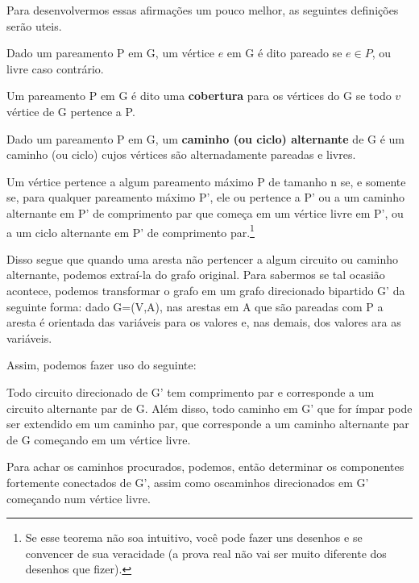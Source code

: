 \documentclass{article}
\begin{document}
Para desenvolvermos essas afirmações um pouco melhor, as seguintes definições serão uteis.

\begin{definition}
  Dado um pareamento P em G, um vértice $e$ em G é dito pareado se $e\in P$, ou livre caso contrário.
\end{definition}

\begin{definition}
  Um pareamento P em G é dito uma \textbf{cobertura} para os vértices do G se todo $v$ vértice de G pertence a P.
\end{definition}

\begin{definition}
  Dado um pareamento P em G, um \textbf{caminho (ou ciclo) alternante} de G é um caminho (ou ciclo) cujos vértices são alternadamente pareadas e livres.
\end{definition}

\begin{theorem}
  Um vértice pertence a algum pareamento máximo P de tamanho n se, e somente se, para qualquer pareamento máximo P', ele ou pertence a P' ou a um caminho alternante em P' de comprimento par que começa em um vértice livre em P', ou a um ciclo alternante
  em P' de comprimento par.\footnote{Se esse teorema não soa intuitivo, você pode fazer uns desenhos e se convencer de sua veracidade (a prova real não vai ser muito diferente dos desenhos que fizer).}
\end{theorem}

Disso segue que quando uma aresta não pertencer a algum circuito ou caminho alternante, podemos extraí-la do grafo original.
Para sabermos se tal ocasião acontece, podemos transformar o grafo em um grafo direcionado bipartido G' da seguinte forma:
dado G=(V,A), nas arestas em A que são pareadas com P a aresta é orientada das variáveis para os valores e, nas demais, dos valores ara as variáveis.

Assim, podemos fazer uso do seguinte:

\begin{theorem}
  Todo circuito direcionado de G' tem comprimento par e corresponde a um circuito alternante par de G. Além disso, todo caminho em G' que for ímpar pode ser extendido em um caminho par, que corresponde a um caminho alternante par de G começando em um vértice livre.
\end{theorem}

Para achar os caminhos procurados, podemos, então determinar os componentes fortemente conectados de G', assim como oscaminhos direcionados em G' começando num vértice livre.
\end{document}
